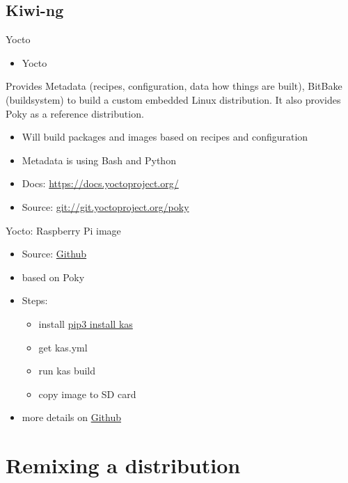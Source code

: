 \documentclass{beamer}
\begin{document}
\subsection{Kiwi-ng}

\begin{frame}{Yocto}
	\begin{itemize}
		\item Yocto 
	\end{itemize}
	\begin{definition} 
		Provides Metadata (recipes, configuration, data how things are built), BitBake (buildsystem) to build a custom embedded Linux distribution. It also provides Poky as a reference distribution.
	\end{definition}
	\begin{itemize}
		\item Will build packages and images based on recipes and configuration
		\item Metadata is using Bash and Python
		\item Docs: \url{https://docs.yoctoproject.org/}
		\item Source: \url{git://git.yoctoproject.org/poky}
	\end{itemize}
\end{frame}

\begin{frame}{Yocto: Raspberry Pi image}
	\begin{itemize}
		\item Source: \href{https://github.com/OSInside/kiwi-descriptions/tree/main/ubuntu/aarch64/ubuntu-jammy-rpi}{Github}
		\item based on Poky
		\item Steps:
		\begin{itemize}
			\item install \url{pip3 install kas}
			\item get kas.yml
			\item run kas build
			\item copy image to SD card
		\end{itemize}
		\item more details on \href{https://github.com/tomirgang/eh21_maintainable_linux/tree/main/examples/first_build_rpi4/yocto}{Github}
	\end{itemize}
\end{frame}

\section{Remixing a distribution}
\end{document}
